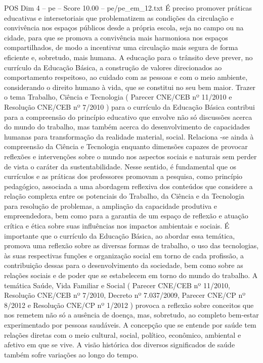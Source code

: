 \begin{textsample}{POS Dim 4 – pe – Score 10.00 – pe/pe\_em\_12.txt}
É preciso promover práticas educativas e intersetoriais que problematizem as condições da circulação e convivência nos espaços públicos desde a própria escola, seja no campo ou na cidade, para que se promova a convivência mais harmoniosa nos espaços compartilhados, de modo a incentivar uma circulação mais segura de forma eficiente e, sobretudo, mais humana.
A educação para o trânsito deve prever, no currículo da Educação Básica, a construção de valores direcionados ao comportamento respeitoso, ao cuidado com as pessoas e com o meio ambiente, considerando o direito humano à vida, que se constitui no seu bem maior.
Trazer o tema Trabalho, Ciência e Tecnologia ( Parecer CNE/CEB nº 11/2010 e Resolução CNE/CEB nº 7/2010 ) para o currículo da Educação Básica contribui para a compreensão do princípio educativo que envolve não só discussões acerca do mundo do trabalho, mas também acerca do desenvolvimento de capacidades humanas para transformação da realidade material, social.
Relaciona -se ainda à compreensão da Ciência e Tecnologia enquanto dimensões capazes de provocar reflexões e intervenções sobre o mundo nos aspectos sociais e naturais sem perder de vista o caráter da sustentabilidade.
Nesse sentido, é fundamental que os currículos e as práticas dos professores promovam a pesquisa, como princípio pedagógico, associada a uma abordagem reflexiva dos conteúdos que considere a relação complexa entre os potenciais do Trabalho, da Ciência e da Tecnologia para resolução de problemas, a ampliação da capacidade produtiva e empreendedora, bem como para a garantia de um espaço de reflexão e atuação crítica e ética sobre suas influências nos impactos ambientais e sociais.
É importante que o currículo da Educação Básica, ao abordar essa temática, promova uma reflexão sobre as diversas formas de trabalho, o uso das tecnologias, às suas respectivas funções e organização social em torno de cada profissão, a contribuição dessas para o desenvolvimento da sociedade, bem como sobre as relações sociais e de poder que se estabelecem em torno do mundo do trabalho.
A temática Saúde, Vida Familiar e Social ( Parecer CNE/CEB nº 11/2010, Resolução CNE/CEB nº 7/2010, Decreto nº 7.037/2009, Parecer CNE/CP nº 8/2012 e Resolução CNE/CP nº 1/2012 ) provoca a reflexão sobre conceitos que nos remetem não só a ausência de doença, mas, sobretudo, ao completo bem-estar experimentado por pessoas saudáveis.
A concepção que se entende por saúde tem relações diretas com o meio cultural, social, político, econômico, ambiental e afetivo em que se vive.
A visão histórica dos diversos significados de saúde também sofre variações ao longo do tempo.

\end{textsample}
